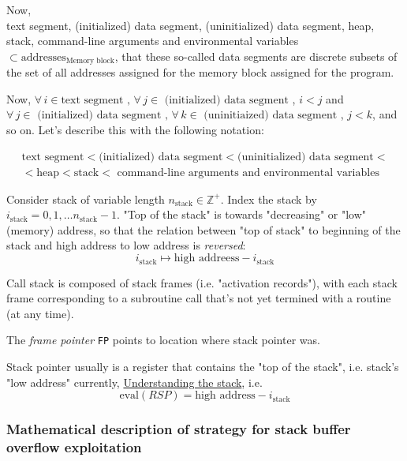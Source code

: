 \documentclass[10pt]{amsart}
\begin{document}
\begin{multicols*}{2}
Now, \\
text segment, (initialized) data segment, (uninitialized) data segment, heap, stack, command-line arguments and environmental variables $\subset \text{addresses}_{\text{Memory block}}$, that these so-called data segments are discrete subsets of the set of all addresses assigned for the memory block assigned for the program.  

Now, $\forall \, i \in \text{text segment }, \, \forall \, j \in \text{ (initialized) data segment }$, $i<j$ and $\forall \, j \in \text{ (initialized) data segment }, \, \forall \, k \in \text{ (uninitiaized) data segment }$, $j<k$, and so on.  Let's describe this with the following notation:  

\begin{equation}
\begin{gathered}
\text{text segment} < \text{(initialized) data segment} < \text{(uninitialized) data segment} < \\ 
< \text{heap} < \text{stack} < \text{ command-line arguments and environmental variables}  
\end{gathered}
\end{equation}

Consider stack of variable length $n_{\text{stack}} \in \mathbb{Z}^+$.  Index the stack by $i_{\text{stack}} = 0,1,\dots n_{\text{stack}} - 1$.  "Top of the stack" is towards "decreasing" or "low" (memory) address, so that the relation between "top of stack" to beginning of the stack and high address to low address is \emph{reversed}: 
\[
i_{\text{stack}} \mapsto \text{high addreess} - i_{\text{stack}}
\]

Call stack is composed of stack frames (i.e. "activation records"), with each stack frame corresponding to a subroutine call that's not yet termined with a routine (at any time).  

The \emph{frame pointer} \verb|FP| points to location where stack pointer was.  

Stack pointer usually is a register that contains the "top of the stack", i.e. stack's "low address" currently,  \href{https://www.cs.umd.edu/class/sum2003/cmsc311/Notes/Mips/stack.html}{Understanding the stack}, i.e. 
\begin{equation}
\text{eval}(RSP) = \text{high address} - i_{\text{stack}}
\end{equation}

\subsubsection{Mathematical description of strategy for stack buffer overflow exploitation}


\end{multicols*}
\end{document}
